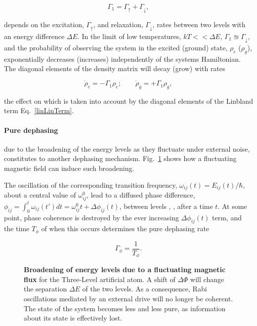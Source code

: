 	\begin{equation}\label{theoGamma1}
	   \Gamma_1=\Gamma_{\uparrow}+\Gamma_{\downarrow},
	\end{equation}
	   
	\noindent depends on the excitation, $ \Gamma_{\uparrow} $, and relaxation, $ \Gamma_{\downarrow} $, rates between two levels with an energy difference $ \Delta E $. In the limit of low temperatures, $ kT<< \Delta E $, $ \Gamma_1\approxeq\Gamma_{\downarrow} $, and the probability of observing the system in the excited (ground) state, $ \rho_e $ ($ \rho_g $), exponentially decreases (increases) independently of the systems Hamiltonian. The diagonal elements of the density matrix will decay (grow) with rates
	
	\begin{equation}
	   \dot{\rho}_{e} = -\Gamma_1\rho_{e};\qquad \dot{\rho}_{g} = +\Gamma_1\rho_{g},
	\end{equation}
	   
	\noindent the effect on which is taken into account by the diagonal elements of the Linbland term Eq.~\eqref{linLinTerm}.
	
	\paragraph{Pure dephasing} due to the broadening of the energy levels as they fluctuate under external noise, constitutes to another dephasing mechanism. Fig.~\ref{deph-slope} shows how a fluctuating magnetic field can induce such broadening.

	The oscillation of the corresponding transition frequency, $ \omega_{ij}(t) =E_{ij}(t)/\hbar$, about a central value of $ \omega_{ij}^{0} $, lead to a diffused phase difference, $ \phi_{ij}=\int_0^{t}\omega_{ij}(t')dt  = \omega_{ij}^{0}t+\Delta\phi_{ij}(t)$, between levels , , after a time $ t $. At some point, phase coherence is destroyed by the ever increasing $ \Delta\phi_{ij}(t) $ term, and the time $ T_{\phi} $  of when this occurs determines the pure dephasing rate
	
	\begin{equation}\label{theoDephasing}
		\Gamma_{\phi} = \frac{1}{T_{\phi}}.
	\end{equation}
	
	\begin{figure}
		\caption{\small \textbf{Broadening of energy levels due to a fluctuating magnetic flux} for the Three-Level artificial atom. A shift of $ \Delta\Phi $ will change the separation $ \Delta E $ of the two levels. As a consequence, Rabi oscillations mediated by an external drive will no longer be coherent. The state of the system becomes less and less pure, as information about its state is effectively lost.}
		\label{deph-slope}
	\end{figure}
	
